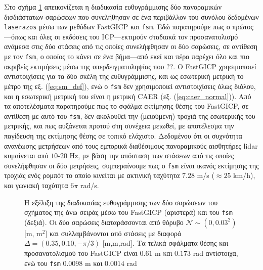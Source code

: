 Στο σχήμα \ref{fig:02_05_04:02} απεικονίζεται η διαδικασία ευθυγράμμισης δύο
πανοραμικών δισδιάστατων σαρώσεων που συνελήθησαν σε ένα περιβάλλον του συνόλου
δεδομένων \texttt{laserazos} μέσω των μεθόδων FastGICP
και \texttt{fsm}.  Εδώ παρατηρούμε πως ο πρώτος---όπως και όλες οι εκδόσεις του
ICP---εκτιμούν σταδιακά τον προσανατολισμό ανάμεσα στις δύο στάσεις από τις
οποίες συνελήφθησαν οι δύο σαρώσεις, σε αντίθεση με τον \texttt{fsm}, ο οποίος
το κάνει σε ένα βήμα---από εκεί και πέρα παρέχει όλο και πιο ακριβείς
εκτιμήσεις μέσω της υπερδειγματοληψίας που ??. Ο FastGICP χρησιμοποιεί
αντιστοιχίσεις για τα δύο σκέλη της ευθυγράμμισης, και ως εσωτερική μετρική το
μέτρο της εξ.  (\ref{eq:sm_def}), ενώ ο \texttt{fsm} δεν χρησιμοποιεί
αντιστοιχίσεις όλως διόλου, και η εσωτερική μετρική του είναι η μετρική CAER
(εξ.  (\ref{eq:caer_normal})). Από τα αποτελέσματα παρατηρούμε πως το σφάλμα
εκτίμησης θέσης του FastGICP, σε αντίθεση με αυτό του \texttt{fsm}, δεν
ακολουθεί την (μειούμενη) τροχιά της εσωτερικής του μετρικής, και πως αυξάνεται
προτού στη συνέχεια μειωθεί, με αποτέλεσμα την παγίδευση της εκτίμησης θέσης σε
τοπικό ελάχιστο. Δεδομένου ότι οι συχνότητα ανανέωσης μετρήσεων από τους
εμπορικά διαθέσιμους πανοραμικούς αισθητήρες lidar κυμαίνεται από $10$-$20$ Hz,
με βάση την απόσταση των στάσεων από τις οποίες συνελήφθησαν οι δύο μετρήσεις,
συμπεραίνουμε πως ο \texttt{fsm} είναι ικανός εκτίμησης της τροχιάς ενός ρομπότ
το οποίο κινείται με ακτινική ταχύτητα $7.28$ m/s ($\approx 25$ km/h), και
γωνιακή ταχύτητα $6\pi$ rad/s.

\begin{figure}[]\centering
  
  \vspace{0.5cm}
  \caption{\small Η εξέλιξη της διαδικασίας ευθυγράμμισης των δύο σαρώσεων του
           σχήματος της άνω σειράς μέσω του FastGICP (αριστερά) και του
           \texttt{fsm} (δεξιά). Οι δύο σαρώσεις διαταράσσονται από θόρυβο
           $\mathcal{N} \sim (0, 0.03^2)$ [m, m$^2$] και συλλαμβάνονται από
           στάσεις με διαφορά $\Delta = (0.35, 0.10, -\pi/3)$ [m,m,rad].
           Τα τελικά σφάλματα θέσης και προσανατολισμού του FastGICP είναι
           $0.61$ m και $0.173$ rad αντίστοιχα, ενώ του \texttt{fsm}
           $0.0098$ m και $0.0014$ rad}
  \label{fig:02_05_04:02}
\end{figure}


